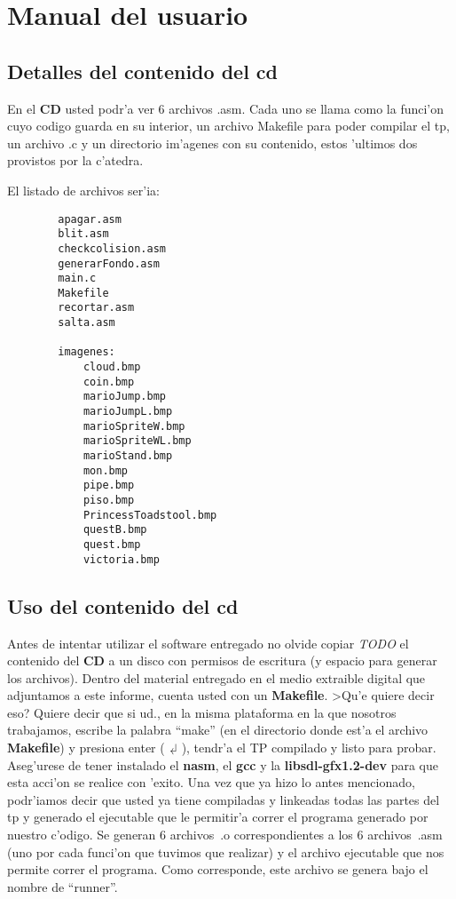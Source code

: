 \section{Manual del usuario}

\subsection{Detalles del contenido del cd}

	En el \textbf{CD} usted podr'a ver 6 archivos .asm. Cada uno se llama como
la funci'on cuyo codigo guarda en su interior, un archivo Makefile para poder
compilar el tp, un archivo .c y un directorio im'agenes con su contenido, estos
'ultimos dos provistos por la c'atedra.

	El listado de archivos ser'ia:
\begin{verbatim}
		apagar.asm
		blit.asm
		checkcolision.asm
		generarFondo.asm
		main.c
		Makefile
		recortar.asm
		salta.asm

		imagenes:
			cloud.bmp
			coin.bmp
			marioJump.bmp
			marioJumpL.bmp
			marioSpriteW.bmp
			marioSpriteWL.bmp
			marioStand.bmp
			mon.bmp
			pipe.bmp
			piso.bmp
			PrincessToadstool.bmp
			questB.bmp
			quest.bmp
			victoria.bmp
\end{verbatim}

\subsection{Uso del contenido del cd}
	Antes de intentar utilizar el software entregado no olvide copiar \textit{TODO} el 
contenido del \textbf{CD} a un disco con permisos de escritura (y espacio para generar
los archivos).
	Dentro del material entregado en el medio extraible digital que adjuntamos
a este informe, cuenta usted con un \textbf{Makefile}. >Qu'e quiere decir eso? Quiere
decir que si ud., en la misma plataforma en la que nosotros trabajamos, escribe
la palabra ``make'' (en el directorio donde est'a el archivo \textbf{Makefile})
y presiona enter ($\dlsh$), tendr'a el TP compilado y listo para probar.
Aseg'urese de tener instalado el \textbf{nasm}, el \textbf{gcc} y la
\textbf{libsdl-gfx1.2-dev} para que esta acci'on se realice con 'exito. Una vez
que ya hizo lo antes mencionado, podr'iamos decir que usted ya tiene compiladas
y linkeadas todas las partes del tp y generado el ejecutable que le permitir'a
correr el programa generado por nuestro c'odigo. Se generan 6 archivos~.o
correspondientes a los 6 archivos~.asm (uno por cada funci'on que tuvimos que
realizar) y el archivo ejecutable que nos permite correr el programa. Como
corresponde, este archivo se genera bajo el nombre de ``runner''.

